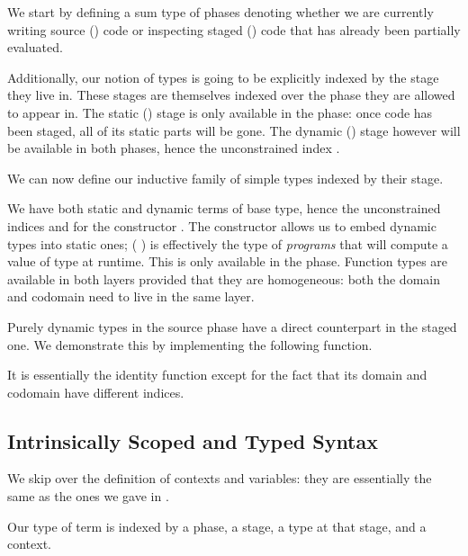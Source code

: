 We start by defining a sum type of phases denoting whether
we are currently writing source () code or inspecting
staged () code that has already been partially evaluated.


Additionally, our notion of types is going to be explicitly
indexed by the stage they live in. These stages are themselves
indexed over the phase they are allowed to appear in.
%
The static () stage is only available in the 
phase: once code has been staged, all of its static parts will
be gone.
%
The dynamic () stage however will be available in both
phases, hence the unconstrained index .


We can now define our inductive family of simple types indexed
by their stage.


We have both static and dynamic terms of base type,
hence the unconstrained indices  and 
for the constructor .
%
The constructor  allows us to embed dynamic
types into static ones; ( ) is effectively
the type of \emph{programs} that will compute a value of
type  at runtime. This is only available in the
 phase.
%
Function types are available in both layers provided that
they are homogeneous: both the domain and codomain need
to live in the same layer.

Purely dynamic types in the source phase have a direct
counterpart in the staged one. We demonstrate this by
implementing the following  function.


It is essentially the identity function except for the
fact that its domain and codomain have different indices.

\subsection{Intrinsically Scoped and Typed Syntax}

We skip over the definition of contexts and variables: they
are essentially the same as the ones we gave in .

Our type of term is indexed by a phase, a stage, a type
at that stage, and a context.


